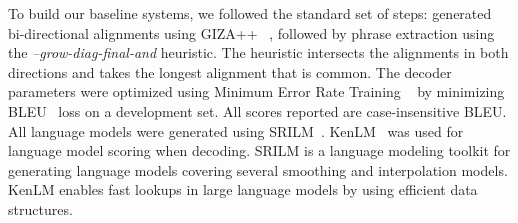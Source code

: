To build our baseline systems, we followed the standard set of steps: generated bi-directional alignments using GIZA++ ~\cite{OchNey:03}, followed by phrase extraction using the \emph{--grow-diag-final-and} heuristic. The heuristic intersects the alignments in both directions and takes the longest alignment that is common. The decoder parameters were optimized using Minimum Error Rate Training ~\cite{Och:03} by minimizing BLEU~\cite{Papineni:02} loss on a development set. All scores reported are case-insensitive BLEU. All language models were generated using SRILM~\cite{Stolcke:02}. KenLM~\cite{Ken:11} was used for language model scoring when decoding. SRILM is a language modeling toolkit for generating language models covering several smoothing and interpolation models. KenLM enables fast lookups in large language models by using efficient data structures.  

